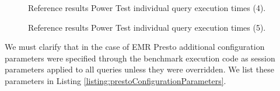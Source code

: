 \begin{figure}
   \begin{center}
   \end{center}
   \caption{Reference results Power Test individual query execution times (4).}
   \label{fig:referenceResultsDataLoadingIndTimes4}
\end{figure}

\begin{figure}
   \begin{center}
   \end{center}
   \caption{Reference results Power Test individual query execution times (5).}
   \label{fig:referenceResultsDataLoadingIndTimes5}
\end{figure}

We must clarify that in the case of EMR Presto additional configuration parameters were specified through the benchmark execution code as session parameters applied to all queries unless they were overridden. We list these parameters in Listing \ref{listing:prestoConfigurationParameters}.


